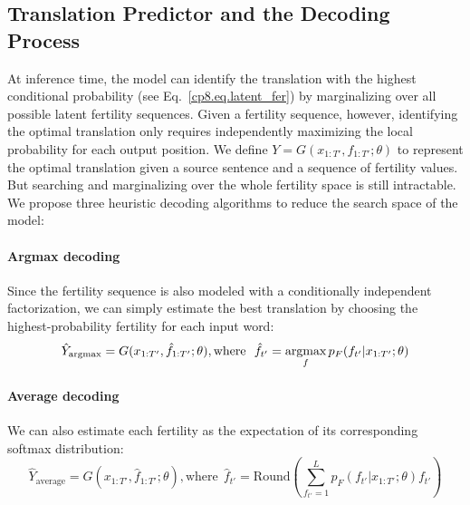 \subsection{Translation Predictor and the Decoding Process}
At inference time, the model can identify the translation with the highest conditional probability (see Eq.~\eqref{cp8.eq.latent_fer}) by marginalizing over all possible latent fertility sequences. 
Given a fertility sequence, however, identifying the optimal translation only requires independently maximizing the local probability for each output position.
We define $Y = G(x_{1:T'}, f_{1:T'}; \theta)$ to represent the optimal translation given a source sentence and a sequence of fertility values.
But searching and marginalizing over the whole fertility space is still intractable. We propose three heuristic decoding algorithms to reduce the search space of the \model{} model:

\paragraph{Argmax decoding} Since the fertility sequence is also modeled with a conditionally independent factorization, we can simply estimate the best translation by choosing the highest-probability fertility for each input word:
\begin{equation}
	\hat{Y}_\text{argmax} = G(x_{1:T'}, \hat{f}_{1:T'};\theta), \textrm{where} \ \ \hat{f}_{t'}=\mathop{\text{argmax}}_f p_F(f_{t'}|x_{1:T'};\theta)
\end{equation}

\paragraph{Average decoding}
We can also estimate each fertility as the expectation of its corresponding softmax distribution:
\begin{equation}
	\hat{Y}_\text{average} = G(x_{1:T'}, \hat{f}_{1:T'};\theta), \textrm{where} \ \ \hat{f}_{t'}=\textrm{Round}\left(\sum_{f_{t'}=1}^L p_F(f_{t'}|x_{1:T'};\theta)f_{t'}\right)
    \label{cp8.eq.average}
\end{equation}

